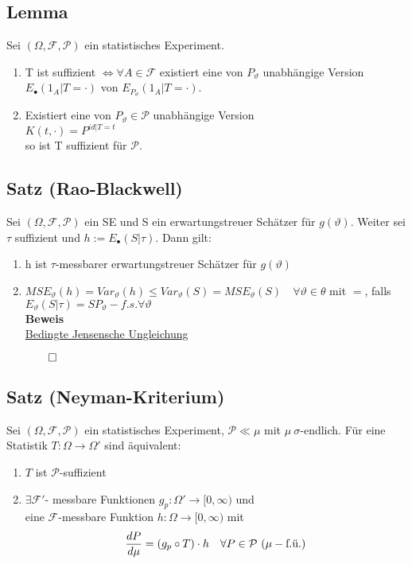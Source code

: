 \documentclass[german,10pt,oneside, fleqn, a4paper]{article}
\newcommand{\LRa}{\Leftrightarrow}
\newcommand{\ra}{\rightarrow}
\newcommand{\QED}{\begin{flushright}$\qed$\end{flushright}}
\newcommand{\mc}[1]{\mathcal{#1}}
\newcommand{\beweis}{\textbf{Beweis}\\}
\newcommand{\1}[1]{1_{#1}}
\newcommand{\2}[1]{\1{\brac{#1}}}
\newcommand{\f}{\mc{F}}
\newcommand{\p}{\mc{P}}
\newcommand{\qf}{\quad\forall}
\begin{document}
\subsection{Lemma}
\label{10.5} Sei $(\Omega,\f,\p)$ ein statistisches Experiment.\begin{enumerate}[label=(\alph*)]
\item T ist suffizient $\LRa \forall A\in\f$ existiert eine von $P_\vartheta$ unabhängige Version $E_\bullet(1_A|T=\cdot)$ von $E_{P_\vartheta}(1_A|T=\cdot).$
\item Existiert eine von $P_\vartheta\in\p$ unabhängige Version \\
$K(t,\cdot)=P^{id|T=t}$\\
so ist T suffizient für $\p$.
\end{enumerate}

\subsection{Satz (Rao-Blackwell)}
\label{10.6}
Sei $(\Omega,\f,\p)$ ein SE und S ein erwartungstreuer Schätzer für $g(\vartheta)$. Weiter sei $\tau$ suffizient und $h:=E_\bullet(S|\tau)$. Dann gilt:\begin{enumerate}[label=(\roman*)]
\item h ist $\tau$-messbarer erwartungstreuer Schätzer für $g(\vartheta)$
\item $MSE_\vartheta(h)=Var_\vartheta(h)\leq Var_\vartheta(S)=MSE_\vartheta(S)\qf\vartheta\in\theta$ mit \grqq$=$\grqq, falls \\
$E_\vartheta(S|\tau)=S P_\vartheta-f.s.\forall\vartheta$\\
\beweis
\hyperref[6.2]{Bedingte Jensensche Ungleichung}\QED
\end{enumerate}

\subsection{Satz (Neyman-Kriterium)}
\label{10.7}
Sei $(\Omega,\f,\p)$ ein statistisches Experiment, $\p\ll\mu$ mit $\mu\ \sigma$-endlich. Für eine Statistik $T:\Omega\ra\Omega'$ sind äquivalent:\begin{enumerate}[label=(\alph*)]
\item $T$ ist $\p$-suffizient
\item $\exists \f'$- messbare Funktionen $g_p:\Omega'\ra [0,\infty)$ und\\ eine $\f$-messbare Funktion $h:\Omega\ra [0,\infty)$ mit \[\dfrac{dP}{d\mu}=(g_p\circ T)\cdot h\quad\forall P\in\p$ $(\mu-\text{f.ü.})\] 
\end{enumerate}
\end{document}
